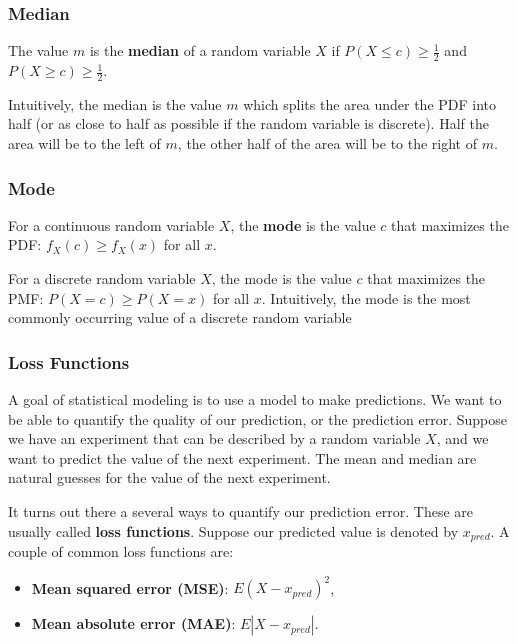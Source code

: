 \documentclass[
]{book}
\providecommand{\tightlist}{%
  \setlength{\itemsep}{0pt}\setlength{\parskip}{0pt}}
\begin{document}
\subsubsection{Median}\label{median-1}

The value \(m\) is the \textbf{median} of a random variable \(X\) if \(P(X \leq c) \geq \frac{1}{2}\) and \(P(X \geq c) \geq \frac{1}{2}\).

Intuitively, the median is the value \(m\) which splits the area under the PDF into half (or as close to half as possible if the random variable is discrete). Half the area will be to the left of \(m\), the other half of the area will be to the right of \(m\).

\subsubsection{Mode}\label{mode-1}

For a continuous random variable \(X\), the \textbf{mode} is the value \(c\) that maximizes the PDF: \(f_X(c) \geq f_X(x)\) for all \(x\).

For a discrete random variable \(X\), the mode is the value \(c\) that maximizes the PMF: \(P(X=c) \geq P(X=x)\) for all \(x\). Intuitively, the mode is the most commonly occurring value of a discrete random variable

\subsubsection{Loss Functions}\label{lossfunc}

A goal of statistical modeling is to use a model to make predictions. We want to be able to quantify the quality of our prediction, or the prediction error. Suppose we have an experiment that can be described by a random variable \(X\), and we want to predict the value of the next experiment. The mean and median are natural guesses for the value of the next experiment.

It turns out there a several ways to quantify our prediction error. These are usually called \textbf{loss functions}. Suppose our predicted value is denoted by \(x_{pred}\). A couple of common loss functions are:

\begin{itemize}
\tightlist
\item
  \textbf{Mean squared error (MSE)}: \(E(X-x_{pred})^2\),
\item
  \textbf{Mean absolute error (MAE)}: \(E|X-x_{pred}|\).
\end{itemize}
\end{document}
